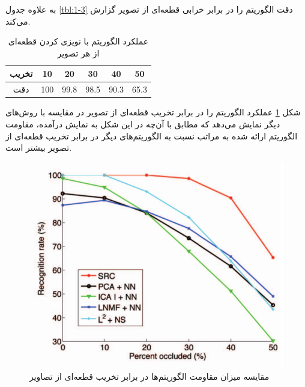 \documentclass[12pt,twocolumn]{article}
\begin{document}
به علاوه جدول \ref{tbl:1-3} دقت الگوریتم را در برابر خرابی قطعه‌ای از تصویر گزارش می‌کند. 

\begin{table}[h]
\centering
\caption{عملکرد الگوریتم  با نویزی کردن قطعه‌ای از هر تصویر \cite{wright2009robust}}
\label{tbl:1-2}
\begin{tabular}{c | c | c | c | c | c }
تخریب&10&20&30&40&50\\
\hline
دقت&100&99.8&98.5&90.3&65.3
\end{tabular}
\end{table}

شکل \ref{fig:1-4} عملکرد الگوریتم را در برابر تخریب قطعه‌ای از تصویر در مقایسه با روش‌های دیگر نمایش می‌دهد که مطابق با آن‌چه در این شکل به نمایش درآمده، مقاومت الگوریتم ارائه شده به مراتب نسبت به الگوریتم‌های دیگر در برابر تخریب قطعه‌ای از تصویر بیشتر است.


\begin{figure}[h]
\centering
\includegraphics[scale=0.2]{Imgs/1-4.png}
\caption{مقایسه میزان مقاومت الگوریتم‌ها در برابر تخریب قطعه‌ای از تصاویر \cite{wright2009robust}}
\label{fig:1-4}
\end{figure}
\end{document}
